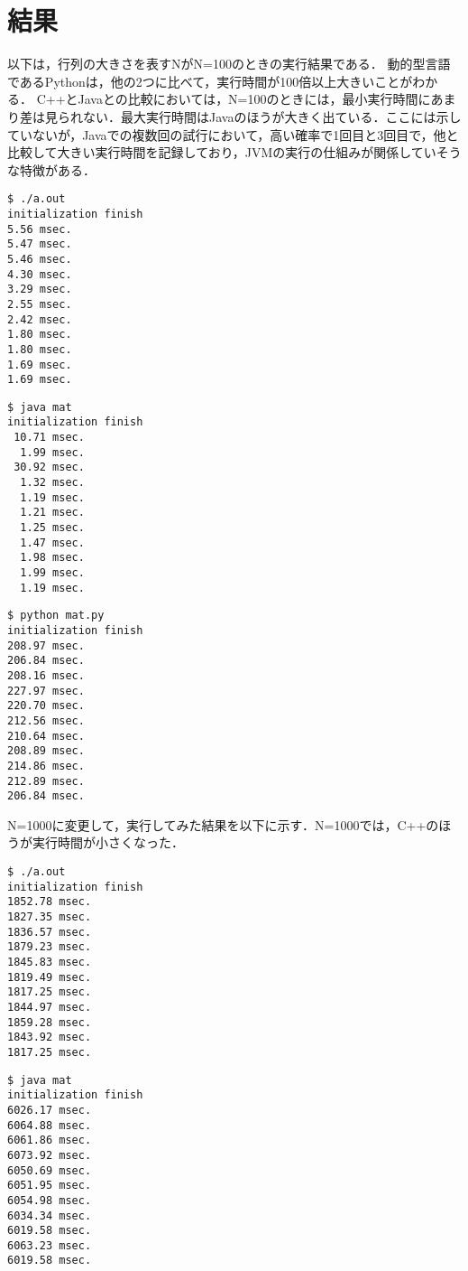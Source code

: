 \documentclass[onecolumn]{preport}
\begin{document}
\section{結果}
以下は，行列の大きさを表すNがN=100のときの実行結果である．
動的型言語であるPythonは，他の2つに比べて，実行時間が100倍以上大きいことがわかる．
C++とJavaとの比較においては，N=100のときには，最小実行時間にあまり差は見られない．最大実行時間はJavaのほうが大きく出ている．ここには示していないが，Javaでの複数回の試行において，高い確率で1回目と3回目で，他と比較して大きい実行時間を記録しており，JVMの実行の仕組みが関係していそうな特徴がある．
\begin{lstlisting}[basicstyle=\ttfamily\footnotesize, frame=single]
$ ./a.out
initialization finish
5.56 msec.
5.47 msec.
5.46 msec.
4.30 msec.
3.29 msec.
2.55 msec.
2.42 msec.
1.80 msec.
1.80 msec.
1.69 msec.
1.69 msec.
\end{lstlisting}

\begin{lstlisting}[basicstyle=\ttfamily\footnotesize, frame=single]
$ java mat
initialization finish
 10.71 msec.
  1.99 msec.
 30.92 msec.
  1.32 msec.
  1.19 msec.
  1.21 msec.
  1.25 msec.
  1.47 msec.
  1.98 msec.
  1.99 msec.
  1.19 msec.
\end{lstlisting}

\begin{lstlisting}[basicstyle=\ttfamily\footnotesize, frame=single]
$ python mat.py
initialization finish
208.97 msec.
206.84 msec.
208.16 msec.
227.97 msec.
220.70 msec.
212.56 msec.
210.64 msec.
208.89 msec.
214.86 msec.
212.89 msec.
206.84 msec.
\end{lstlisting}

N=1000に変更して，実行してみた結果を以下に示す．N=1000では，C++のほうが実行時間が小さくなった．

\begin{lstlisting}[basicstyle=\ttfamily\footnotesize, frame=single]
$ ./a.out
initialization finish
1852.78 msec.
1827.35 msec.
1836.57 msec.
1879.23 msec.
1845.83 msec.
1819.49 msec.
1817.25 msec.
1844.97 msec.
1859.28 msec.
1843.92 msec.
1817.25 msec.
\end{lstlisting}

\begin{lstlisting}[basicstyle=\ttfamily\footnotesize, frame=single]
$ java mat
initialization finish
6026.17 msec.
6064.88 msec.
6061.86 msec.
6073.92 msec.
6050.69 msec.
6051.95 msec.
6054.98 msec.
6034.34 msec.
6019.58 msec.
6063.23 msec.
6019.58 msec.
\end{lstlisting}

\end{document}
